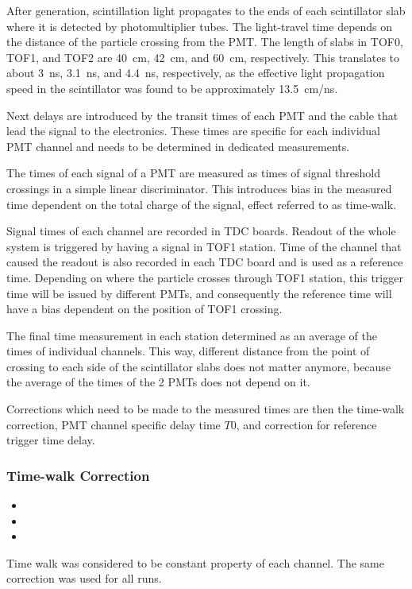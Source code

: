 After generation, scintillation light propagates to the ends of each
scintillator slab where it is detected by photomultiplier tubes. The
light-travel time depends on the distance of the particle crossing
from the PMT. The length of slabs in TOF0, TOF1, and TOF2 are 40~cm,
42~cm, and 60~cm, respectively. This translates to about 3~ns, 3.1~ns,
and 4.4~ns, respectively, as the effective light propagation speed in
the scintillator was found to be approximately 13.5~cm/ns.

Next delays are introduced by the transit times of each PMT and the
cable that lead the signal to the electronics. These times are
specific for each individual PMT channel and needs to be determined
in dedicated measurements.

The times of each signal of a PMT are measured as times of signal threshold
crossings in a simple linear discriminator. This introduces bias in
the measured time dependent on the total charge of the signal, effect
referred to as time-walk.

Signal times of each channel are recorded in TDC boards. Readout of
the whole system is triggered by having a signal in TOF1 station. Time of
the channel that caused the readout is also recorded in each TDC board
and is used as a reference time. Depending on where the particle
crosses through TOF1 station, this trigger time will be issued by
different PMTs, and consequently the reference time will have a bias
dependent on the position of TOF1 crossing.

The final time measurement in each station determined as an average of
the times of individual channels. This way, different distance from
the point of crossing to each side of the scintillator slabs does not
matter anymore, because the average of the times of the 2 PMTs does
not depend on it.

Corrections which need to be made to the measured times are then the
time-walk correction, PMT channel specific delay time $T0$, and
correction for reference trigger time delay.


\subsubsection{Time-walk Correction}
\begin{itemize}
\item {}
\item  {}
\item  {}
\end{itemize}
Time walk was considered to be constant property of each channel. The
same correction was used for all runs.


